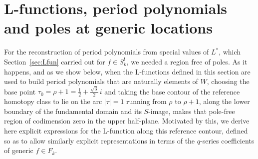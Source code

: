 \documentclass[11pt]{article}
\begin{document}
\section{L-functions, period polynomials and poles at generic locations}\label{sec:arc}


For the reconstruction of period polynomials from special values of $L^*$, which
Section~\ref{sec:Lfun} carried out for $f\in S^!_k$, we needed a region free of poles. As it
happens, and as we show below, when the L-functions defined in this
section are used to build period polynomials that are naturally elements of $W$, choosing the base
point $\tau_0=\rho+1=\tfrac{1}{2}+\tfrac{\sqrt3}{2}\,i$ and taking the base contour of the
reference homotopy class to lie on the arc $|\tau|=1$ running from $\rho$ to $\rho+1$, along the
lower boundary of the fundamental domain and its $S$-image, makes that pole-free region of
codimension zero in the upper half-plane. Motivated by this, we derive here explicit expressions
for the L-function along this reference contour, defined so as to allow similarly explicit
representations in terms of the $q$-series coefficients of generic $f\in F_k$.
\end{document}
